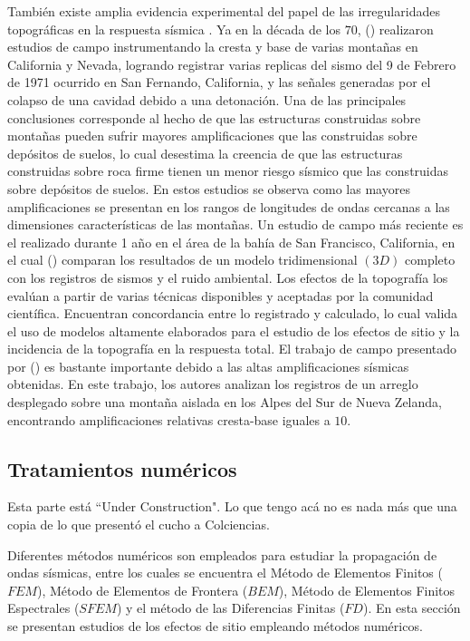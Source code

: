 \documentclass[spanish,letterpaper,12pt,twoside,openany]{article}
\begin{document}
También existe amplia evidencia experimental del papel de las irregularidades topográficas en la respuesta sísmica \citep[por ejemplo,][]{Hartzell2013, Buech2010, Tucker1984, Griffiths1979, Rogers1974, Davis1973}. Ya en la década de los $70$, \citeauthor{Davis1973} (\citeyear{Davis1973}) realizaron estudios de campo instrumentando la cresta y base de varias montañas en California y Nevada, logrando registrar varias replicas del sismo del 9 de Febrero de 1971 ocurrido en San Fernando, California, y las señales generadas por el colapso de una cavidad debido a una detonación. Una de las principales conclusiones corresponde al hecho de que las estructuras construidas sobre montañas pueden sufrir mayores amplificaciones que las construidas sobre depósitos de suelos, lo cual desestima la creencia de que las estructuras construidas sobre roca firme tienen un menor riesgo sísmico que las construidas sobre depósitos de suelos. En estos estudios se observa como las mayores amplificaciones se presentan en los rangos de longitudes de ondas cercanas a las dimensiones características de las montañas. Un estudio de campo más reciente es el realizado durante 1 año en el área de la bahía de San Francisco, California, en el cual \citeauthor{Hartzell2013} (\citeyear{Hartzell2013}) comparan los resultados de un modelo tridimensional $\left( 3D \right)$ completo con los registros de sismos y el ruido ambiental. Los efectos de la topografía los evalúan a partir de varias técnicas disponibles y aceptadas por la comunidad científica. Encuentran concordancia entre lo registrado y calculado, lo cual valida el uso de modelos altamente elaborados para el estudio de los efectos de sitio y la incidencia de la topografía en la respuesta total. El trabajo de campo presentado por \citeauthor{Buech2010} (\citeyear{Buech2010}) es bastante importante debido a las altas amplificaciones sísmicas obtenidas. En este trabajo, los autores analizan los registros de un arreglo desplegado sobre una montaña aislada en los Alpes del Sur de Nueva Zelanda, encontrando amplificaciones relativas cresta-base iguales a $10$.
%
%
%
%
%
\subsection{Tratamientos numéricos}
%
Esta parte está ``Under Construction". Lo que tengo acá no es nada más que una copia de lo que presentó el cucho a Colciencias.

Diferentes métodos numéricos son empleados para estudiar la propagación de ondas sísmicas, entre los cuales se encuentra el Método de Elementos Finitos ($FEM$), Método de Elementos de Frontera ($BEM$), Método de Elementos Finitos Espectrales ($SFEM$) y el método de las Diferencias Finitas ($FD$). En esta sección se presentan estudios de los efectos de sitio empleando métodos numéricos.
\end{document}

